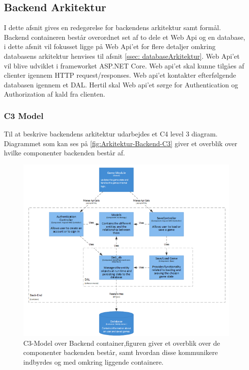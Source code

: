\subsection{Backend Arkitektur}
\label{ssec: BackendArkitektur}
I dette afsnit gives en redegørelse for backendens arkitektur samt formål.\\ 
 
\noindent Backend containeren består overordnet set af to dele et Web Api og en database, i dette afsnit vil fokusset ligge på Web Api'et for flere detaljer omkring databasens arkitektur henvises til afsnit \autoref{ssec: databaseArkitektur}. Web Api'et vil blive udviklet i frameworket ASP.NET Core. Web api'et skal kunne tilgåes af clienter igennem HTTP request/responses. Web api'et kontakter efterfølgende databasen igennem et DAL. Hertil skal Web api'et sørge for Authentication og Authorization af kald fra clienten.\\

\subsubsection{C3 Model}

\noindent Til at beskrive backendens arkitektur udarbejdes et C4 level 3 diagram. Diagrammet som kan ses på \autoref{fig:Arkitektur-Backend-C3} giver et overblik over hvilke componenter backenden består af.
 
\begin{figure}[H]
\centering
\includegraphics[width = \textwidth]{02-Body/Images/Backend_C3.PNG}
\caption{C3-Model over Backend container,figuren giver et overblik over de componenter backenden består, samt hvordan disse kommunikere indbyrdes og med omkring liggende containere.}
\label{fig:Arkitektur-Backend-C3}
\end{figure}

